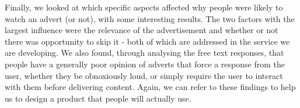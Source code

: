 Finally, we looked at which specific aspects affected why people were likely to watch an advert (or not), with some interesting results. The two factors with the largest influence were the relevance of the advertisement and whether or not there was opportunity to skip it - both of which are addressed in the service we are developing. We also found, through analysing the free text responses, that people have a generally poor opinion of adverts that force a response from the user, whether they be obnoxiously loud, or simply require the user to interact with them before delivering content. Again, we can refer to these findings to help us to design a product that people will actually use. 
